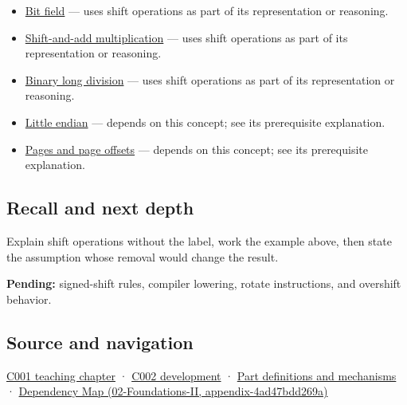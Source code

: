 \begin{itemize}
\item
  \hyperref[appendix-ac697f5c66e8]{Bit field} --- uses shift operations as part of its representation or reasoning.
\item
  \hyperref[appendix-a65290d66ed9]{Shift-and-add multiplication} --- uses shift operations as part of its representation or reasoning.
\item
  \hyperref[appendix-89985e6a2685]{Binary long division} --- uses shift operations as part of its representation or reasoning.
\item
  \hyperref[appendix-367b6abf460e]{Little endian} --- depends on this concept; see its prerequisite explanation.
\item
  \hyperref[appendix-0c67cd5bf30a]{Pages and page offsets} --- depends on this concept; see its prerequisite explanation.
\end{itemize}

\subsection{Recall and next depth}\label{appendix-73425b25118e-recall-and-next-depth}

Explain shift operations without the label, work the example above, then state the assumption whose removal would change the result.

\textbf{Pending:} signed-shift rules, compiler lowering, rotate instructions, and overshift behavior.

\subsection{Source and navigation}\label{appendix-73425b25118e-source-and-navigation}

\hyperref[01-foundations-i-ch001-from-a-signal-to-an-interpretation]{C001 teaching chapter} · \hyperref[01-foundations-i-ch001-arithmetic-becomes-a-policy]{C002 development} · \hyperref[appendix-fd090d982a15]{Part definitions and mechanisms} · \href{../02-Foundations-II/main.pdf\#nameddest=appendix-4ad47bdd269a}{Dependency Map (02-Foundations-II, appendix-4ad47bdd269a)}

